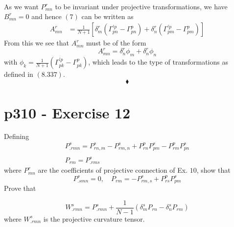 As we want $P^r_{mn}$ to be invariant under projective transformations, we have $B^r_{mn}=0$ and hence $(7)$ can be written as
\begin{align*}
A^r_{mn}&=\frac{1}{N+1}\left[\delta^r_m\left( \Gamma^{'p}_{pn}-\Gamma^p_{pn}\right) +  \delta^r_n \left(\Gamma^{'p}_{pm} -   \Gamma^p_{pm} \right)\right]
\end{align*}
From this we see that $A^r_{mn}$ must be of the form
$$A^r_{mn}=\delta^r_n\phi_m+\delta^r_n\phi_n$$
with $\phi_k = \frac{1}{N+1}\left( \Gamma^{'p}_{pk}-\Gamma^p_{pk}\right) $, which leads to the type of transformations as defined in $\mathbf{(8.337)}$.
$$\blacklozenge$$
\newpage


\section{p310 - Exercise 12}
\begin{tcolorbox}
Defining  $$\begin{matrix}
P^s_{.rmn}=P^s_{rn,m}-P^s_{rm,n}+P^p_{rn}P^s_{pm}-P^p_{rm}P^s_{pn} \\\\
P_{rm}=P^s_{.rms}
\end{matrix}$$
where  $P^r_{mn}$ are the coefficients of projective connection of Ex. $10$, show that
$$P^s_{.smn}=0,\quad P_{rm}=-P^s_{rm,s}+P^p_{rs}P^s_{pm}  $$
Prove that 

$$W^s_{.rmn}=P^s_{.rmn}+\frac{1}{N-1}\left(\delta^s_m P_{rn}-\delta^s_nP_{rm}\right) $$
where $W^s_{.rmn}$ is the projective curvature tensor.
\end{tcolorbox}

